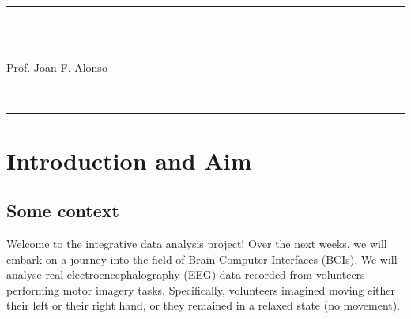 \documentclass[11pt]{exam}
\begin{document}
    {\sffamily\color{upc}\noindent\rule{\textwidth}{1.5pt}\\[2mm]
        \begin{minipage}[c]{.18\textwidth}
        \end{minipage}
        \hfill
        \begin{minipage}[c]{.6\textwidth}
            \begin{center}
                \\[3mm]
                {\large Prof. Joan F. Alonso}\\[3mm]
            \end{center}
        \end{minipage}
        \hfill
        \\[2mm]
        \noindent\rule{\textwidth}{1.5pt}
    }

    \tableofcontents %
    \thispagestyle{empty}
    \setcounter{page}{0}
    \newpage


    \section{Introduction and Aim}
    \subsection{Some context}
    Welcome to the integrative data analysis project! Over the next weeks, we will embark on a journey into the field of Brain-Computer Interfaces (BCIs). We will analyse real electroencephalography (EEG) data recorded from volunteers performing motor imagery tasks. Specifically, volunteers imagined moving either their left or their right hand, or they remained in a relaxed state (no movement).
\end{document}
